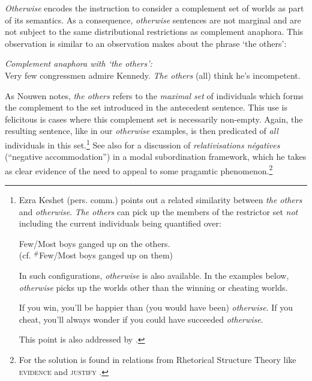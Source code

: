 \textit{Otherwise} encodes the instruction to consider a complement set of worlds as part of its semantics. As a consequence, \textit{otherwise} sentences are not marginal and are not subject to the same distributional restrictions as complement anaphora. This observation is similar to an observation \citet[109ff]{nouwen2003} makes about the phrase `the others': 

\pex  \textit{Complement anaphora with \emph{`the others'}:}\\
Very few congressmen admire Kennedy. \textit{The others} (all) think he's incompetent.\xe

As Nouwen notes, \textit{the others} refers to the \textit{maximal set} of individuals which forms the complement to the set introduced in the antecedent sentence. This use is felicitous is cases where this complement set is necessarily non-empty. Again, the resulting sentence, like in our \textit{otherwise} examples, is then predicated of \textit{all} individuals in this set.\footnote{Ezra Keshet (pers. comm.) points out a related similarity between \textit{the others} and \textit{otherwise}. \textit{The others} can pick up the members of the restrictor set \textit{not} including the current individuals being quantified over:
	
	\pex  Few/Most boys ganged up on the others.\\ (cf. $ ^\# $Few/Most boys ganged up on them)\xe
	
	In such configurations, \textit{otherwise} is also available. In the examples below, \textit{otherwise} picks up the worlds other than the winning or cheating worlds.
	
	\pex  \a If you win, you'll be happier than (you would have been) \textit{otherwise}.
	\a If you cheat, you'll always wonder if you could have succeeded \textit{otherwise}.\xe
	
	This point is also addressed by \citet[8]{Webber2001}.} %
See also \citet{Corblin1994,Corblin2002} for a discussion of \textit{relativisations négatives} (``negative accommodation'') in a modal subordination framework, which he takes as clear evidence of the need to appeal to some pragamtic phenomenon.\footnote{For \citet[260]{Corblin2002} the solution is found in relations from Rhetorical Structure Theory like \textsc{evidence} and \textsc{justify} \citep[apud][]{Mann1988}.} %

%
%


